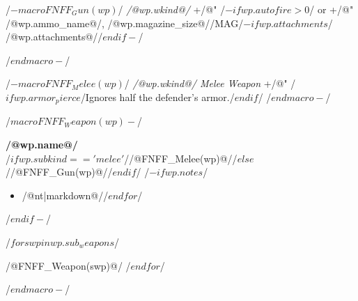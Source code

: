 /$-macro FNFF_Gun(wp)$/
\textit{/@wp.wkind@/}  +/@"%
/$-if wp.autofire > 0$/ or +/@"%
/@wp.ammo_name@/,  /@wp.magazine_size@//MAG/$-if wp.attachments$/\\
/@wp.attachments@//$endif-$/

/$endmacro-$/

/$- macro FNFF_Melee(wp) $/
\textit{/@wp.wkind@/ Melee Weapon} +/@"%
/$if wp.armor_pierce$/Ignores half the defender's armor./$endif$/
/$endmacro-$/

/$ macro FNFF_Weapon(wp) -$/
\begin{minipage}{\columnwidth}
\textbf{/@wp.name@/}\\
/$if wp.subkind == 'melee'$//@FNFF_Melee(wp)@//$else$//@FNFF_Gun(wp)@//$endif$/
/$-if wp.notes$/
\begin{itemize}
/$for nt in wp.notes $/\item /@nt|markdown@//$endfor$/
\end{itemize}
/$endif-$/
\end{minipage}
/$for swp in wp.sub_weapons$/

/@FNFF_Weapon(swp)@/
/$endfor$/

/$ endmacro -$/